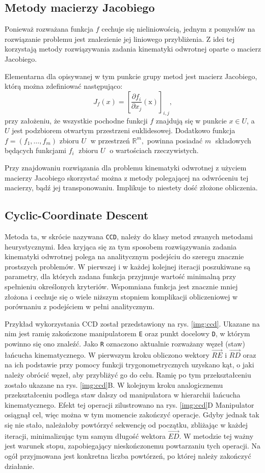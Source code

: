 \documentclass[11pt]{mwrep}
\begin{document}
    \subsection{Metody macierzy Jacobiego}

Ponieważ rozważana funkcja $f$ cechuje się nieliniowością, jednym z pomysłów na rozwiązanie problemu jest znalezienie jej liniowego przybliżenia. Z idei tej korzystają metody rozwiązywania zadania kinematyki odwrotnej oparte o macierz Jacobiego.

Elementarna dla opisywanej w tym punkcie grupy metod jest macierz Jacobiego, którą można zdefiniować następująco:
$$J_f(x) = \left[\frac{\partial f_i}{\partial x_j}(\mathrm x)\right]_{i, j} ,$$
przy założeniu, że wszystkie pochodne funkcji $f$  znajdują się w punkcie $x\in U$, a $U$ jest podzbiorem otwartym przestrzeni euklidesowej. Dodatkowo funkcja $ f = (f_1, \dots, f_m)$ zbioru $U\;$ w przestrzeń $ \mathbb{R}^m,$ powinna posiadać $m\;$ składowych będących funkcjami $f_i\;$ zbioru $U\;$ o wartościach rzeczywistych.

Przy znajdowaniu rozwiązania dla problemu kinematyki odwrotnej z użyciem macierzy Jacobiego skorzystać można z metody polegającej na odwróceniu tej macierzy, bądź jej transponowaniu. Implikuje to niestety dość złożone obliczenia.
\pagebreak
    \subsection{Cyclic-Coordinate Descent}

  Metoda ta, w skrócie nazywana \texttt{CCD}, należy do klasy metod zwanych metodami heurystycznymi. Idea kryjąca się za tym sposobem rozwiązywania zadania kinematyki odwrotnej polega na analitycznym podejściu do szeregu znacznie prostszych problemów. W pierwszej i w każdej kolejnej iteracji poszukiwane są parametry, dla których zadana funkcja przyjmuje wartość minimalną przy spełnieniu określonych kryteriów. Wspomniana funkcja jest znacznie mniej złożona i cechuje się o wiele niższym stopniem komplikacji obliczeniowej w porównaniu z podejściem w pełni analitycznym.

  Przykład wykorzystania CCD został przedstawiony na rys. \ref{img:ccd}. Ukazane na nim jest ramię zakończone manipulatorem \texttt{E} oraz punkt docelowy \texttt{D}, w którym powinno się ono znaleźć. Jako \texttt{R} oznaczono aktualnie rozważany węzeł (staw) łańcucha kinematycznego. W pierwszym kroku obliczono wektory $\vec{RE}$ i $\vec{RD}$ oraz na ich podstawie przy pomocy funkcji trygonometrycznych uzyskano kąt, o jaki należy obrócić węzeł, aby przybliżyć go do celu. Ramię po tym przekształceniu zostało ukazane na rys. \ref{img:ccd}B. W kolejnym kroku analogicznemu przekształceniu podlega staw dalszy od manipulatora w hierarchii łańcucha kinematycznego. Efekt tej operacji zilustrowano na rys. \ref{img:ccd}D Manipulator osiągnął cel, więc można w tym momencie zakończyć operacje. Gdyby jednak tak się nie stało, należałoby powtórzyć sekwencję od początku, zbliżając w każdej iteracji, minimalizując tym samym długość wektora $\vec{ED}$. W metodzie tej ważny jest warunek stopu, zapobiegający nieskończonemu powtarzaniu tych operacji. Na ogół przyjmowana jest konkretna liczba powtórzeń, po której należy zakończyć działanie.
\end{document}
